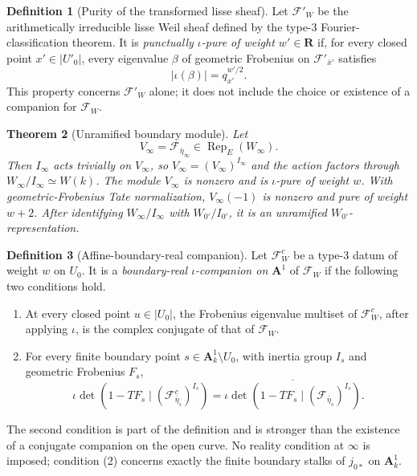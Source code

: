 \documentclass[10pt]{article}
\newtheorem{theorem}{Theorem}[section]
\theoremstyle{definition}
\newtheorem{definition}[theorem]{Definition}
\begin{document}
\begin{definition}[Purity of the transformed lisse sheaf]
Let \(\mathcal F'_W\) be the arithmetically irreducible lisse Weil sheaf
defined by the type-3 Fourier-classification theorem.  It is
\emph{punctually \(\iota\)-pure of weight \(w'\in\mathbf R\)} if, for every
closed point \(x'\in|U'_0|\), every eigenvalue \(\beta\) of geometric
Frobenius on \(\mathcal F'_{\bar x'}\) satisfies
\[
                   |\iota(\beta)|=q_{x'}^{w'/2}.
\]
This property concerns \(\mathcal F'_W\) alone; it does not include the
choice or existence of a companion for \(\mathcal F_W\).
\end{definition}

\begin{theorem}[Unramified boundary module]
Let
\[
 V_\infty=\mathcal F_{\bar\eta_\infty}
 \in\operatorname{Rep}_E(W_\infty).
\]
Then \(I_\infty\) acts trivially on \(V_\infty\), so
\(V_\infty=(V_\infty)^{I_\infty}\) and the action factors through
\(W_\infty/I_\infty\simeq W(k)\).  The module \(V_\infty\) is nonzero and
is \(\iota\)-pure of weight \(w\).  With geometric-Frobenius Tate
normalization, \(V_\infty(-1)\) is nonzero and pure of weight \(w+2\).
After identifying \(W_\infty/I_\infty\) with
\(W_{0'}/I_{0'}\), it is an unramified \(W_{0'}\)-representation.
\end{theorem}

\begin{definition}[Affine-boundary-real companion]
Let \(\mathcal F_W^c\) be a type-3 datum of weight \(w\) on \(U_0\).  It is a
\emph{boundary-real \(\iota\)-companion on \(\mathbf A^1\)} of
\(\mathcal F_W\) if the following two conditions hold.
\begin{enumerate}
\item At every closed point \(u\in|U_0|\), the Frobenius eigenvalue multiset
      of \(\mathcal F_W^c\), after applying \(\iota\), is the complex
      conjugate of that of \(\mathcal F_W\).
\item For every finite boundary point
      \(s\in\mathbf A^1_k\setminus U_0\), with inertia group
      \(I_s\) and geometric Frobenius \(F_s\),
      \[
       \iota\det\!\left(1-TF_s\mid
          (\mathcal F^c_{\bar\eta_s})^{I_s}\right)
       =\overline{\iota\det\!\left(1-TF_s\mid
          (\mathcal F_{\bar\eta_s})^{I_s}\right)}.
      \]
\end{enumerate}
The second condition is part of the definition and is stronger than the
existence of a conjugate companion on the open curve.  No reality condition
at \(\infty\) is imposed; condition (2) concerns exactly the finite boundary
stalks of \(j_{0*}\) on \(\mathbf A^1_k\).
\end{definition}
\end{document}
